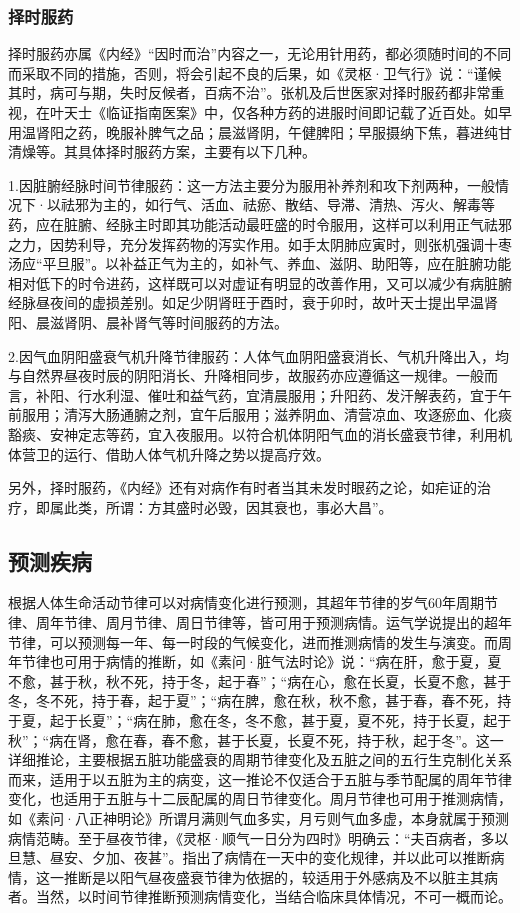 \documentclass[draft,12pt]{ctexbook}
\begin{document}
\subsubsection{择时服药}%

择时服药亦属《内经》“因时而治”内容之一，无论用针用药，都必须随时间的不同而采取不同的措施，否则，将会引起不良的后果，如《灵枢·卫气行》说：“谨候其时，病可与期，失时反候者，百病不治”。张机及后世医家对择时服药都非常重视，在叶天士《临证指南医案》中，仅各种方药的进服时间即记载了近百处。如早用温肾阳之药，晚服补脾气之品；晨滋肾阴，午健脾阳；早服摄纳下焦，暮进纯甘清燥等。其具体择时服药方案，主要有以下几种。

1.因脏腑经脉时间节律服药：这一方法主要分为服用补养剂和攻下剂两种，一般情况下·以祛邪为主的，如行气、活血、祛瘀、散结、导滞、清热、泻火、解毒等药，应在脏腑、经脉主时即其功能活动最旺盛的时令服用，这样可以利用正气祛邪之力，因势利导，充分发挥药物的泻实作用。如手太阴肺应寅时，则张机强调十枣汤应“平旦服”。以补益正气为主的，如补气、养血、滋阴、助阳等，应在脏腑功能相对低下的时令进药，这样既可以对虚证有明显的改善作用，又可以减少有病脏腑经脉昼夜间的虚损差别。如足少阴肾旺于酉时，衰于卯时，故叶天士提出早温肾阳、晨滋肾阴、晨补肾气等时间服药的方法。

2.因气血阴阳盛衰气机升降节律服药：人体气血阴阳盛衰消长、气机升降出入，均与自然界昼夜时辰的阴阳消长、升降相同步，故服药亦应遵循这一规律。一般而言，补阳、行水利湿、催吐和益气药，宜清晨服用；升阳药、发汗解表药，宜于午前服用；清泻大肠通腑之剂，宜午后服用；滋养阴血、清营凉血、攻逐瘀血、化痰豁痰、安神定志等药，宜入夜服用。以符合机体阴阳气血的消长盛衰节律，利用机体营卫的运行、借助人体气机升降之势以提高疗效。

另外，择时服药，《内经》还有对病作有时者当其未发时眼药之论，如疟证的治疗，即属此类，所谓：方其盛时必毁，因其衰也，事必大昌”。

\subsection{预测疾病}%

根据人体生命活动节律可以对病情变化进行预测，其超年节律的岁气60年周期节律、周年节律、周月节律、周日节律等，皆可用于预测病情。运气学说提出的超年节律，可以预测每一年、每一时段的气候变化，进而推测病情的发生与演变。而周年节律也可用于病情的推断，如《素问·脏气法时论》说：“病在肝，愈于夏，夏不愈，甚于秋，秋不死，持于冬，起于春”；“病在心，愈在长夏，长夏不愈，甚于冬，冬不死，持于春，起于夏”；“病在脾，愈在秋，秋不愈，甚于春，春不死，持于夏，起于长夏”；“病在肺，愈在冬，冬不愈，甚于夏，夏不死，持于长夏，起于秋”；“病在肾，愈在春，春不愈，甚于长夏，长夏不死，持于秋，起于冬”。这一详细推论，主要根据五脏功能盛衰的周期节律变化及五脏之间的五行生克制化关系而来，适用于以五脏为主的病变，这一推论不仅适合于五脏与季节配属的周年节律变化，也适用于五脏与十二辰配属的周日节律变化。周月节律也可用于推测病情，如《素问·八正神明论》所谓月满则气血多实，月亏则气血多虚，本身就属于预测病情范畴。至于昼夜节律，《灵枢·顺气一日分为四时》明确云：“夫百病者，多以旦慧、昼安、夕加、夜甚”。指出了病情在一天中的变化规律，并以此可以推断病情，这一推断是以阳气昼夜盛衰节律为依据的，较适用于外感病及不以脏主其病者。当然，以时间节律推断预测病情变化，当结合临床具体情况，不可一概而论。
\end{document}
